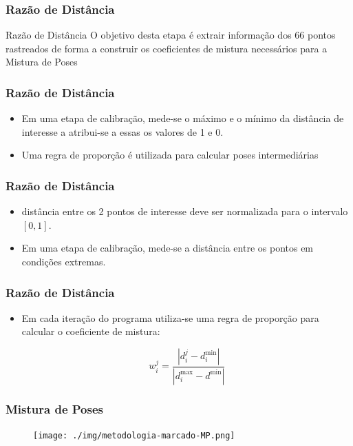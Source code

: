 \documentclass[brazil]{beamer}
\begin{document}
\begin{frame}
\frametitle{Razão de Distância}

\begin{block}{Razão de Distância}
  O objetivo desta etapa é extrair informação dos 66 pontos rastreados de forma
  a construir os coeficientes de mistura necessários para a Mistura de Poses
\end{block}
\end{frame}

\begin{frame}
\frametitle{Razão de Distância}
  \begin{itemize}
      \item Em uma etapa de calibração, mede-se o máximo e o mínimo da
        distância de interesse a atribui-se a essas os valores de 1 e 0.
      \item Uma regra de proporção é utilizada para calcular poses
        intermediárias
  \end{itemize} 
\end{frame}

\begin{frame}
\frametitle{Razão de Distância}
  \begin{itemize}
      \item distância entre os 2 pontos de interesse deve ser normalizada 
        para o intervalo $[0, 1]$.

      \item Em uma etapa de calibração, mede-se a distância entre os pontos em
        condições extremas.
  \end{itemize} 
\end{frame}

\begin{frame}
\frametitle{Razão de Distância}
  \begin{itemize}
      \item Em cada iteração do programa utiliza-se uma regra de proporção para
        calcular o coeficiente de mistura:

\begin{equation}
	w_i^j = \frac{|d_i^j - d_i^{\text{min}}|}{|d_i^{\text{max}} - d^{\text{min}}|}
   \label{eq:pesos1}
\end{equation}

  \end{itemize} 
\end{frame}

\begin{frame}
\frametitle{Mistura de Poses}
        \begin{figure}
            \centering
            \texttt{[image: ./img/metodologia-marcado-MP.png]}
      \end{figure}
\end{frame}
\end{document}
